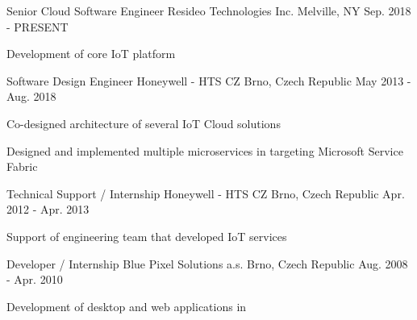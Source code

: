 

\begin{cventries}

  \cventry
    {Senior Cloud Software Engineer} %
    {Resideo Technologies Inc.} %
    {Melville, NY} %
    {Sep. 2018 - PRESENT} %
    {
      \begin{cvitems} %
        \item {Development of core IoT platform}
      \end{cvitems}
    }

  \cventry
    {Software Design Engineer} %
    {Honeywell - HTS CZ} %
    {Brno, Czech Republic} %
    {May 2013 - Aug. 2018} %
    {
      \begin{cvitems} %
        \item {Co-designed architecture of several IoT Cloud solutions}
        \item {Designed and implemented multiple microservices in \Csharp{} targeting Microsoft Service Fabric}
      \end{cvitems}
    }

  \cventry
    {Technical Support / Internship} %
    {Honeywell - HTS CZ} %
    {Brno, Czech Republic} %
    {Apr. 2012 - Apr. 2013} %
    {
      \begin{cvitems} %
        \item {Support of engineering team that developed IoT services}
      \end{cvitems}
    }

  \cventry
    {\Csharp{} Developer / Internship} %
    {Blue Pixel Solutions a.s.} %
    {Brno, Czech Republic} %
    {Aug. 2008 - Apr. 2010} %
    {
      \begin{cvitems} %
        \item {Development of desktop and web applications in \Csharp{}}
      \end{cvitems}
    }

\end{cventries}
